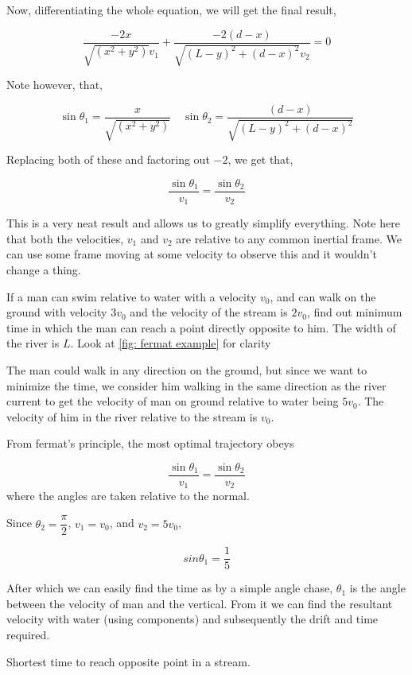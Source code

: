 Now, differentiating the whole equation, we will get the final result,

\begin{equation}
    \frac{-2x}{\sqrt{(x^2+y^2)}v_1} + \frac{-2(d-x)}{\sqrt{(L-y)^2 + (d-x)^2}v_2} = 0 
\end{equation}

Note however, that, 

\begin{equation*}
    \sin\theta_1 = \frac{x}{\sqrt{(x^2+y^2)}} \quad \sin\theta_2 = \frac{(d-x)}{\sqrt{(L-y)^2 + (d-x)^2}}
\end{equation*}

Replacing both of these and factoring out \(-2\), we get that, 

\begin{equation}
    \boxed{\frac{\sin\theta_1}{v_1} = \frac{\sin\theta_2}{v_2}}
\end{equation}

This is a very neat result and allows us to greatly simplify everything. Note 
here that both the velocities, \(v_1\) and \(v_2\) are relative to any common inertial
frame. We can use some frame moving at some velocity to observe this and it wouldn't change 
a thing. 

\begin{example}
    If a man can swim relative to water with a velocity \(v_0\), and can walk on the ground 
    with velocity \(3v_0\) and the velocity of the stream is \(2v_0\), find out minimum time 
    in which the man can reach a point directly opposite to him. The width of the river is \(L\).
    Look at \cref{fig: fermat example} for clarity

    \begin{soln}
        The man could walk in any direction on the ground, but since we want to minimize 
        the time, we consider him walking in the same direction as the river current to get 
        the velocity of man on ground relative to water being \(5v_0\). The velocity 
        of him in the river relative to the stream is \(v_0\). 

        From fermat's principle, the most optimal trajectory obeys 
        
        \begin{equation*}
            \frac{\sin\theta_1}{v_1} = \frac{\sin\theta_2}{v_2}
        \end{equation*}
        where the angles are taken relative to the normal. 
        
        Since \(\theta_2 = \dfrac{\pi}{2}\), \(v_1 = v_0\), and \(v_2 = 5v_0\),

        \begin{equation*}
            sin\theta_1 = \frac{1}{5}
        \end{equation*}

        After which we can easily find the time as by a simple angle chase, \(\theta_1\) is 
        the angle between the velocity of man and the vertical. From it we 
        can find the resultant velocity with water (using components) 
        and subsequently the drift and time required.
    \end{soln}
\end{example}

\begin{marginfigure}
    \centering
    \caption{Shortest time to reach opposite point in a stream.}
    \label{fig: fermat example}
\end{marginfigure}